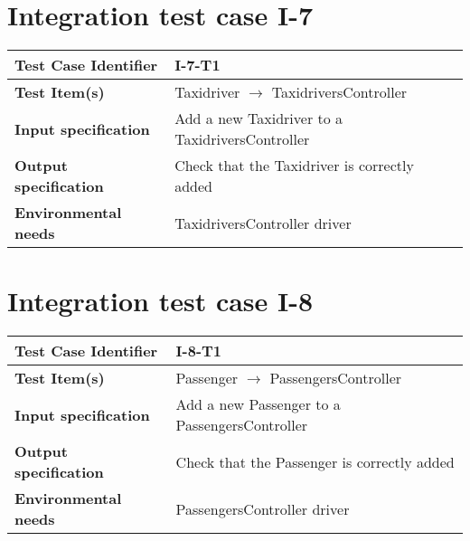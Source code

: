 \section{Integration test case I-7}
\begin{tabular*}{1.23\textwidth}{ l l }
 \textbf{Test Case Identifier}		& I-7-T1 \\
 \hline
 \textbf{Test Item(s)}			& Taxidriver $\rightarrow$ TaxidriversController \\
 \hline
 \textbf{Input specification}		& Add a new Taxidriver to a TaxidriversController \\
 \hline
 \textbf{Output specification}		& Check that the Taxidriver is correctly added \\
 \hline
 \textbf{Environmental needs}		& TaxidriversController driver \\
\end{tabular*}

\section{Integration test case I-8}
\begin{tabular*}{1.23\textwidth}{ l l }
 \textbf{Test Case Identifier}		& I-8-T1 \\
 \hline
 \textbf{Test Item(s)}			& Passenger $\rightarrow$ PassengersController \\
 \hline
 \textbf{Input specification}		& Add a new Passenger to a PassengersController \\
 \hline
 \textbf{Output specification}		& Check that the Passenger is correctly added \\
 \hline
 \textbf{Environmental needs}		& PassengersController driver \\
\end{tabular*}


